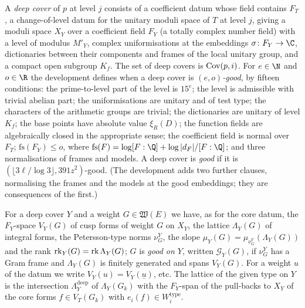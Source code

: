 \begin{definition}\label{pf:lift2:def:deep}
A \emph{deep cover} of $p$ at level $j$ consists of a coefficient datum whose field contains $F_T$, a
change-of-level datum for the unitary moduli space of $T$ at level $j$, giving a moduli space $X_Y$ over a
coefficient field $F_Y$ (a totally complex number field) with a level of modulus $M'_Y$, complex uniformisations at
the embeddings $\sigma\colon F_Y\to\C$, dictionaries between their components and frames of the local unitary group,
and a compact open subgroup $K_f$. The set of deep covers is $\operatorname{Cov}(p,i)$. For $e\in\N$ and $o\in\R$ the
development defines when a deep cover is \emph{$(e,o)$-good}, by fifteen conditions: the prime-to-level part of
the level is $15^e$; the level is admissible with trivial abelian part; the uniformisations are unitary and of test
type; the characters of the arithmetic groups are trivial; the dictionaries are unitary of level $K_f$; the base
points have absolute value $\xi_R(D)$; the function fields are algebraically closed in the appropriate sense; the
coefficient field is normal over $F_T$; $\mathrm{fs}(F_Y)\le o$, where
$\mathrm{fs}(F)=\log[F:\Q]+\log|d_F|/[F:\Q]$; and three normalisations of frames and models. A deep cover is
\emph{good} if it is $(\lfloor3\ell/\log3\rfloor,391z^2)$-good. (The development adds two further clauses,
normalising the frames and the models at the good embeddings; they are consequences of the first.)

For a deep cover $Y$ and a weight $G\in\mathfrak W(E)$ we have, as for the core datum, the $F_Y$-space $V_Y(G)$ of
cusp forms of weight $G$ on $X_Y$, the lattice $\Lambda_Y(G)$ of integral forms, the Petersson-type norms $\nu^Y_G$,
the slope $\mu_Y(G)=\mu_{\nu^Y_G}(\Lambda_Y(G))$ and the rank $\operatorname{rk}_Y(G)=\operatorname{rk}\Lambda_Y(G)$; $G$ is
\emph{good on $Y$}, written $\mathcal G_Y(G)$, if $\nu^Y_G$ has a Gram frame and $\Lambda_Y(G)$ is finitely generated
and spans $V_Y(G)$. For a weight $u$ of the datum we write $V_Y(u)=V_Y(\underline u)$, etc. The lattice of the given
type on $Y$ is the intersection $\Lambda^{\mathrm{deep}}_Y$ of $\Lambda_Y(G_k)$ with the $F_Y$-span of the pull-backs
to $X_Y$ of the core forms $f\in V_T(G_k)$ with $e_i(f)\in W_i^{\mathrm{type}}$.


\end{definition}
